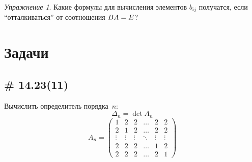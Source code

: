 \documentclass[a4paper,12pt]{article}
\theoremstyle{remark}
\newtheorem*{exercise}{Упражнение}
\begin{document}
  \begin{exercise}
    Какие формулы для вычисления элементов $b_{ij}$ получатся, если ``отталкиваться'' от соотношения $BA \hm= E$?
  \end{exercise}
  
  
  
  
  
  
  
  \section{Задачи}
  
  \subsection{\# 14.23(11)}
  
  Вычислить определитель порядка~$n$:
  \[
    \Delta_n = \det A_n
  \]
  \[
    A_n = \begin{pmatrix}
      1      & 2      & 2      & \ldots & 2      & 2\\
      2      & 1      & 2      & \ldots & 2      & 2\\
      \vdots & \vdots & \vdots & \ddots & \vdots & \vdots\\
      2      & 2      & 2      & \ldots & 1      & 2\\
      2      & 2      & 2      & \ldots & 2      & 1
    \end{pmatrix}
  \]
  
\end{document}
